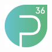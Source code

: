 \begin{titlepage}
\begin{figure} [b!]
    \centering
    \includegraphics[width=1.9cm]{Bilder/p36Logo}
\end{figure}

\end{titlepage}

\restoregeometry
